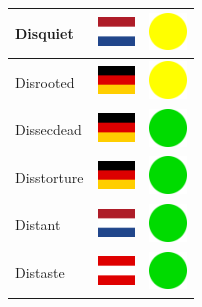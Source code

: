 \documentclass[12pt, a4paper, twoside]{report}
\begin{document}
\begin{center}
\begin{longtable}{|p{5cm}|p{2cm}|p{2cm}|}
 Disquiet                                                   & \includegraphics[width=1cm]{../4x3/nl} &   \includegraphics[width=1cm]{../likes/m} \\ \hline
 Disrooted                                                  & \includegraphics[width=1cm]{../4x3/de} &   \includegraphics[width=1cm]{../likes/m} \\ \hline
 Dissecdead                                                 & \includegraphics[width=1cm]{../4x3/de} &   \includegraphics[width=1cm]{../likes/y} \\ \hline
 Disstorture                                                & \includegraphics[width=1cm]{../4x3/de} &   \includegraphics[width=1cm]{../likes/y} \\ \hline
 Distant                                                    & \includegraphics[width=1cm]{../4x3/nl} &   \includegraphics[width=1cm]{../likes/y} \\ \hline
 Distaste                                                   & \includegraphics[width=1cm]{../4x3/at} &   \includegraphics[width=1cm]{../likes/y} \\ \hline

\end{longtable}
\end{center}
\end{document}
